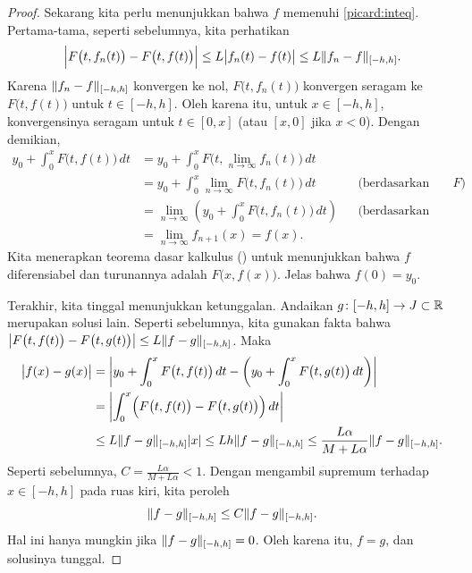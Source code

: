 \begin{proof}
Sekarang kita perlu menunjukkan bahwa $f$ memenuhi \eqref{picard:inteq}.
Pertama-tama, seperti sebelumnya, kita perhatikan
\begin{equation*}
\Bigl\lvert {F\bigl(t,f_{n}(t)\bigr) - 
F\bigl(t,f(t)\bigr)} \Bigr\rvert
\leq
L \bigl\lvert {f_n(t)-f(t)} \bigr\rvert
\leq
L \lVert {f_n-f} \rVert_{[-h,h]} .
\end{equation*}
Karena $\lVert {f_n-f} \rVert_{[-h,h]}$ konvergen ke nol,
$F\bigl(t,f_n(t)\bigr)$ konvergen seragam ke $F\bigl(t,f(t)\bigr)$
untuk $t \in [-h,h]$.  Oleh karena itu, untuk $x \in [-h,h]$,
konvergensinya seragam %
untuk $t \in [0,x]$ (atau $[x,0]$ jika $x < 0$).  Dengan demikian,
\begin{align*}
y_0
+
\int_0^{x}
F\bigl(t,f(t)\bigr)\,dt
& =
y_0
+
\int_0^{x}
F\bigl(t,\lim_{n\to\infty} f_n(t)\bigr)\,dt
& &
\\
& =
y_0
+
\int_0^{x}
\lim_{n\to\infty} F\bigl(t,f_n(t)\bigr)\,dt
& & \text{(berdasarkan kekontinuan } F\text{)}
\\
& =
\lim_{n\to\infty} 
\left(
y_0
+
\int_0^{x}
F\bigl(t,f_n(t)\bigr)\,dt
\right)
& & \text{(berdasarkan konvergensi seragam)}
\\
& =
\lim_{n\to\infty} 
f_{n+1}(x)
=
f(x) .
& &
\end{align*}
Kita menerapkan teorema dasar kalkulus () untuk menunjukkan bahwa
$f$ diferensiabel dan turunannya adalah $F\bigl(x,f(x)\bigr)$.  Jelas bahwa
$f(0) = y_0$.

Terakhir, kita tinggal menunjukkan ketunggalan.  Andaikan $g \colon [-h,h]
\to J \subset {\mathbb{R}}$ merupakan solusi lain.
Seperti sebelumnya, kita gunakan fakta bahwa
$\bigl\lvert {F\bigl(t,f(t)\bigr) - F\bigl(t,g(t)\bigr)} \bigr\rvert \leq L \lVert {f-g} \rVert_{[-h,h]}$.
Maka
\begin{equation*}
\begin{split}
\bigl\lvert {f(x)-g(x)} \bigr\rvert
& =
\left\lvert {
y_0
+
\int_0^{x}
F\bigl(t,f(t)\bigr)\,dt
-
\left(
y_0
+
\int_0^{x}
F\bigl(t,g(t)\bigr)\,dt
\right)
} \right\rvert
\\
& =
\left\lvert {
\int_0^{x}
\Bigl(
F\bigl(t,f(t)\bigr)
-
F\bigl(t,g(t)\bigr)
\Bigr)
\,dt
} \right\rvert
\\
& \leq
L\lVert {f-g} \rVert_{[-h,h]}\lvert {x} \rvert
\leq
Lh\lVert {f-g} \rVert_{[-h,h]}
\leq
\frac{L\alpha}{M+L\alpha}\lVert {f-g} \rVert_{[-h,h]} .
\end{split}
\end{equation*}
Seperti
sebelumnya, $C = \frac{L\alpha}{M+L\alpha} < 1$.  Dengan mengambil supremum terhadap $x \in
[-h,h]$ pada
ruas kiri, kita peroleh
\begin{equation*}
\lVert {f-g} \rVert_{[-h,h]} \leq C \lVert {f-g} \rVert_{[-h,h]} .
\end{equation*}
Hal ini hanya mungkin jika $\lVert {f-g} \rVert_{[-h,h]} = 0$.  Oleh karena itu, $f=g$, dan
solusinya tunggal.
\end{proof}


